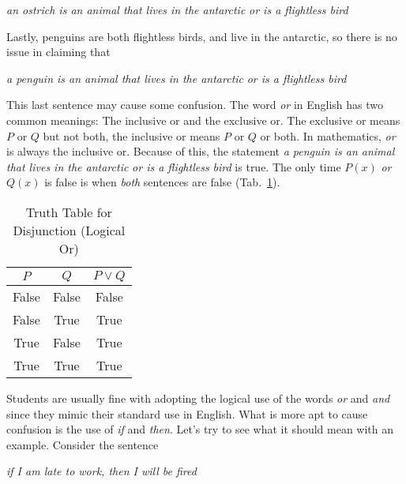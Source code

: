             \begin{center}
                \textit{an ostrich is an animal that lives in the antarctic}
                \textit{or is a flightless bird}
            \end{center}
            Lastly, penguins are both flightless birds, and live in the
            antarctic, so there is no issue in claiming that
            \begin{center}
                \textit{a penguin is an animal that lives in the antarctic}
                \textit{or is a flightless bird}
            \end{center}
            This last sentence may cause some confusion. The word
            \textit{or} in English has two common meanings: The inclusive
            or and the exclusive or. The exclusive or means $P$ or $Q$ but not
            both, the inclusive or means $P$ or $Q$ or both. In mathematics,
            \textit{or} is always the inclusive or. Because of this, the
            statement 
            \textit{a penguin is an animal that lives in the antarctic}
            \textit{or is a flightless bird} is true.
            The only time $P(x)$ \textit{or} $Q(x)$ is false is when
            \textit{both} sentences are false
            (Tab.~\ref{tab:truth_table_disjunction}).
            \begin{table}[H]
                \centering
                \begin{tabular}{c | c | c}
                    $P$&$Q$&$P\lor{Q}$\\
                    \hline
                    False&False&False\\
                    \hline
                    False&True&True\\
                    \hline
                    True&False&True\\
                    \hline
                    True&True&True
                \end{tabular}
                \caption{Truth Table for Disjunction (Logical Or)}
                \label{tab:truth_table_disjunction}
            \end{table}
            Students are usually fine with adopting the logical use of the
            words \textit{or} and \textit{and} since they mimic their standard
            use in English. What is more apt to cause confusion is the use of
            \textit{if} and \textit{then}. Let's try to see what it should mean
            with an example. Consider the sentence
            \begin{center}
                \textit{if I am late to work, then I will be fired}
            \end{center}
